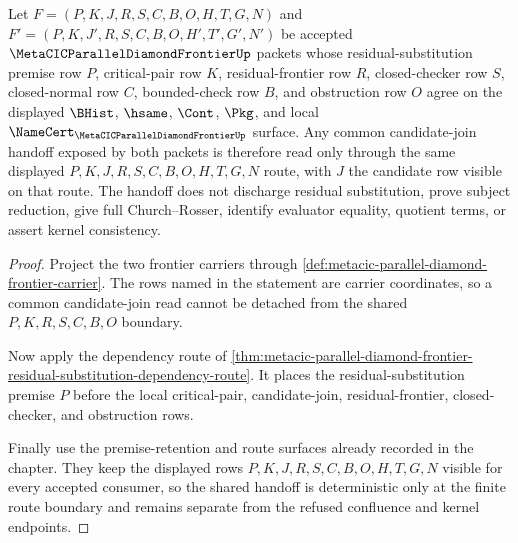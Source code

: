 \begin{theorem}
\label{thm:metacic-parallel-diamond-frontier-residual-premise-join-determinacy}
Let $F=(P,K,J,R,S,C,B,O,H,T,G,N)$ and $F'=(P,K,J',R,S,C,B,O,H',T',G',N')$ be accepted $\MetaCICParallelDiamondFrontierUp$ packets whose residual-substitution premise row $P$, critical-pair row $K$, residual-frontier row $R$, closed-checker row $S$, closed-normal row $C$, bounded-check row $B$, and obstruction row $O$ agree on the displayed $\BHist$, $\hsame$, $\Cont$, $\Pkg$, and local $\NameCert_{\MetaCICParallelDiamondFrontierUp}$ surface. Any common candidate-join handoff exposed by both packets is therefore read only through the same displayed $P,K,J,R,S,C,B,O,H,T,G,N$ route, with $J$ the candidate row visible on that route. The handoff does not discharge residual substitution, prove subject reduction, give full Church--Rosser, identify evaluator equality, quotient terms, or assert kernel consistency.
\end{theorem}
\begin{proof}
Project the two frontier carriers through \autoref{def:metacic-parallel-diamond-frontier-carrier}. The rows named in the statement are carrier coordinates, so a common candidate-join read cannot be detached from the shared $P,K,R,S,C,B,O$ boundary.

Now apply the dependency route of \autoref{thm:metacic-parallel-diamond-frontier-residual-substitution-dependency-route}. It places the residual-substitution premise $P$ before the local critical-pair, candidate-join, residual-frontier, closed-checker, and obstruction rows.

Finally use the premise-retention and route surfaces already recorded in the chapter. They keep the displayed rows $P,K,J,R,S,C,B,O,H,T,G,N$ visible for every accepted consumer, so the shared handoff is deterministic only at the finite route boundary and remains separate from the refused confluence and kernel endpoints.
\end{proof}

